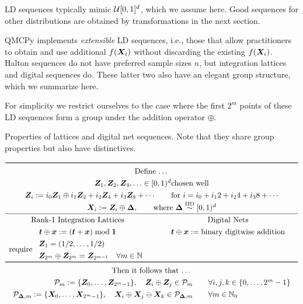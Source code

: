 \documentclass[graybox,footinfo]{svmult}
\newcommand{\IID}{\textup{IID}}
\newcommand{\IIDsim}{\overset{\IID}{\sim}}
\begin{document}
LD sequences typically mimic ${\mathcal{U}}[0,1]^d$, which we assume here.  Good sequences for other distributions are obtained by transformations in the next section.  

QMCPy implements \emph{extensible} LD sequences, i.e., those that allow practitioners to obtain and use additional $f({\boldsymbol{X}}_i)$ without discarding the existing $f({\boldsymbol{X}}_i)$.  Halton sequences do not have preferred sample sizes $n$, but integration lattices and digital sequences do.  These latter two also have an elegant group structure, which we summarize here.  

For simplicity we restrict ourselves to the case where the first $2^m$ points of these LD sequences form a group under the addition operator $\oplus$.

\begin{table}
	\centering
	\caption{Properties of lattices and digital net sequences.  Note that they share group properties but also have distinctives.} \label{tab:GroupProp}
\[
	\renewcommand{\arraystretch}{1.3}
\begin{array}{c@{\qquad}c}
	\toprule
	\multicolumn{2}{c}{\text{Define \ldots}} \\
	\multicolumn{2}{c}{\bsZ_1, \bsZ_2, \bsZ_4, \ldots \in [0,1)^d \text{chosen well} } \\
	\multicolumn{2}{c}{
	\bsZ_{i} := i_0  \bsZ_1 \oplus i_1 \bsZ_{2} + i_2  \bsZ_{4} +  i_3  \bsZ_{8} + \cdots 
	\qquad
	\text{for }i = i_0 +i_1 2 + i_2 4 + i_3 8 + \cdots} \\
    \multicolumn{2}{c}{\bsX_i := \bsZ_i \oplus \bsDelta, \qquad \text{where }\bsDelta \IIDsim [0,1)^d} \\  \hline
	\text{Rank-1 Integration Lattices} & \text{Digital Nets} \\
		\bst \oplus \bsx : = (\bst + \bsx) \bmod \bsone & \bst \oplus \bsx := \text{binary digitwise addition} \\ 
		 \text{require } \begin{array}{l} \bsZ_1 = (1/2, \ldots, 1/2) \\
		 	\bsZ_{2^{m}} \oplus \bsZ_{2^{m}} = \bsZ_{2^{m-1}} \quad \forall m \in \bbN \end{array}
		\\
\toprule
\multicolumn{2}{c}{\text{Then it follows that \ldots}} \\
	\multicolumn{2}{c}{\begin{array}{r}
			\calP_m := \{\bsZ_0, \ldots, \bsZ_{2^m-1}\}, \quad
			\bsZ_i \oplus \bsZ_j \in \calP_m \\
			\calP_{\bsDelta,m} := \{\bsX_0, \ldots, \bsX_{2^m-1}\}, \quad
			\bsX_i \oplus \bsX_j \ominus \bsX_k \in \calP_{\bsDelta,m}
	\end{array} \quad \begin{array}{l}\forall  i,j,k \in \{0, \ldots, 2^{m} -1\} \\ \forall m \in \bbN_0\end{array}}
\end{array}
\]
\end{table}
\end{document}
